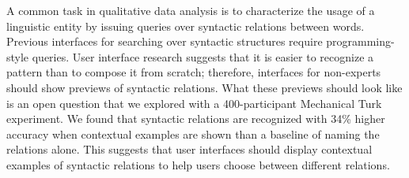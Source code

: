 
A common task in qualitative data analysis is to characterize the usage of a linguistic entity by issuing queries over syntactic relations between words.
Previous interfaces for  searching over syntactic structures require programming-style queries. User interface research suggests that it is easier to recognize a pattern than to compose it from scratch; therefore, interfaces for non-experts should show previews of syntactic relations. What these previews should look like is an open question that we explored with a 400-participant Mechanical Turk experiment. We found that syntactic relations are recognized with 34\% higher accuracy when contextual examples are shown than a baseline of naming the relations alone.  This suggests that user interfaces should display contextual examples of syntactic relations to help users choose between different relations.